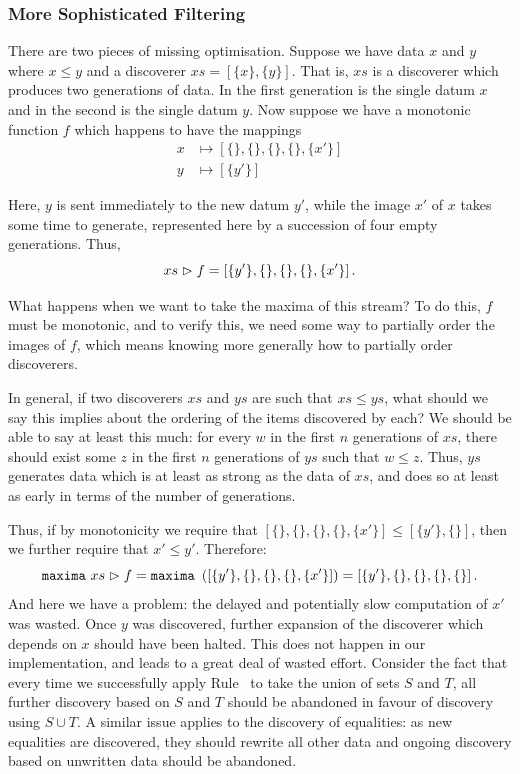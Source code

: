 \subsubsection{More Sophisticated Filtering}
There are two pieces of missing optimisation. Suppose we have data $x$ and $y$ where $x \leq y$ and a discoverer $xs = \left[\{x\}, \{y\}\right].$ That is, $xs$ is a discoverer which produces two generations of data. In the first generation is the single datum $x$ and in the second is the single datum $y$. Now suppose we have a monotonic function $f$ which happens to have the mappings
\begin{align*}
x &\mapsto \left[\{\},\{\},\{\},\{\},\{x'\}\right]\\
y &\mapsto \left[\{y'\}\right]
\end{align*}

Here, $y$ is sent immediately to the new datum $y'$, while the image $x'$ of $x$ takes some time to generate, represented here by a succession of four empty generations. Thus,
\begin{displaymath}
xs \vartriangleright f = \left[\{y'\}, \{\}, \{\}, \{\}, \{x'\}\right].
\end{displaymath}

What happens when we want to take the maxima of this stream? To do this, $f$ must be monotonic, and to verify this, we need some way to partially order the images of $f$, which means knowing more generally how to partially order discoverers.

In general, if two discoverers $xs$ and $ys$ are such that $xs \leq ys$, what should we say this implies about the ordering of the items discovered by each? We should be able to say at least this much: for every $w$ in the first $n$ generations of $xs$, there should exist some $z$ in the first $n$ generations of $ys$ such that $w \leq z$. Thus, $ys$ generates data which is at least as strong as the data of $xs$, and does so at least as early in terms of the number of generations.

Thus, if by monotonicity we require that $\left[\{\},\{\},\{\},\{\},\{x'\}\right] \leq \left[\{y'\},\{\}\right]$, then we further require that $x' \leq y'$. Therefore:
\begin{displaymath}
\texttt{maxima}\ xs \vartriangleright f = \texttt{maxima}\ \left(\left[\{y'\}, \{\}, \{\}, \{\}, \{x'\}\right]\right) = \left[\{y'\}, \{\}, \{\}, \{\}, \{\}\right].
\end{displaymath}
And here we have a problem: the delayed and potentially slow computation of $x'$ was wasted. Once $y$ was discovered, further expansion of the discoverer which depends on $x$ should have been halted. This does not happen in our implementation, and leads to a great deal of wasted effort. Consider the fact that every time we successfully apply Rule~ to take the union of sets $S$ and $T$, all further discovery based on $S$ and $T$ should be abandoned in favour of discovery using $S \cup T$. A similar issue applies to the discovery of equalities: as new equalities are discovered, they should rewrite all other data and ongoing discovery based on unwritten data should be abandoned.

